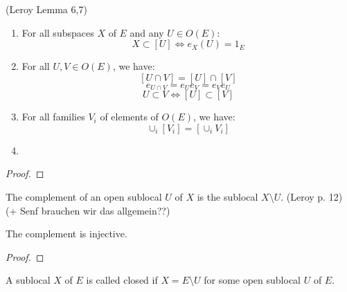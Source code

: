\begin{lemma}
(Leroy Lemma 6,7)
    \label{lem:sublocal_properties}
    \leanok
    \begin{enumerate}
        \item For all subspaces $X$ of $E$ and any $U \in O(E)$:
        \[X \subset [U] \iff e_X(U) = 1_E\]

        \item For all $U, V \in O(E)$, we have:
        \[[U \cap V] = [U] \cap [V]\]
        \[e_{U \cap V} = e_Ue_V=e_Ve_U\]
        \[U \subset V \iff [U] \subset [V]\]
        \item
        For all families $V_i$ of elements of $O(E)$, we have:
        \[\cup_i[V_i] = [\cup_iV_i]\]

        \item
    \end{enumerate}
\end{lemma}
\begin{proof}
    \leanok
\end{proof}


\begin{definition}[Complement]
    \label{def:complement}
    \leanok
    The complement of an open sublocal $U$ of $X$ is the sublocal $X \setminus U$.
    (Leroy p. 12) (+ Senf brauchen wir das allgemein??)
\end{definition}

\begin{lemma}
    \label{lem:complement_injective}
    \leanok
    The complement is injective.
\end{lemma}
\begin{proof}
    \leanok
\end{proof}

\begin{definition}
    \label{def:closed_sublocal}
    \leanok
    A sublocal $X$ of $E$ is called closed if $X = E \setminus U$ for some open sublocal $U$ of $E$.
\end{definition}

